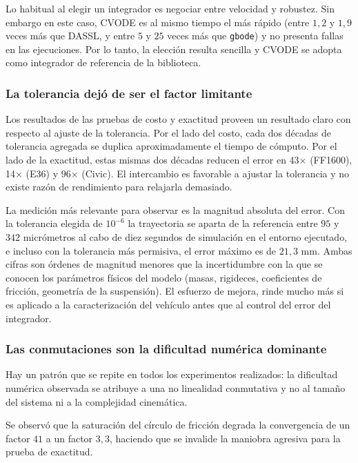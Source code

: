 Lo habitual al elegir un integrador es negociar entre velocidad y robustez. Sin embargo en este caso, CVODE es al mismo tiempo el más rápido (entre $1{,}2$ y $1{,}9$ veces más que DASSL, y entre $5$ y $25$ veces más que \verb|gbode|) y no presenta fallas en las ejecuciones. Por lo tanto, la elección resulta sencilla y CVODE se adopta como integrador de referencia de la biblioteca.

\subsubsection{La tolerancia dejó de ser el factor limitante}

Los resultados de las pruebas de costo y exactitud proveen un resultado claro con respecto al ajuste de la tolerancia. Por el lado del costo, cada dos décadas de tolerancia agregada se duplica aproximadamente el tiempo de cómputo. Por el lado de la exactitud, estas mismas dos décadas reducen el error en 43× (FF1600), 14× (E36) y 96× (Civic). El intercambio es favorable a ajustar la tolerancia y no existe razón de rendimiento para relajarla demasiado.
 
La medición más relevante para observar es la magnitud absoluta del error. Con la tolerancia elegida de $10^{-6}$ la trayectoria se aparta de la referencia entre $95$ y $342$ micrómetros al cabo de diez segundos de simulación en el entorno ejecutado, e incluso con la tolerancia más permisiva, el error máximo es de $21{,}3$ mm. Ambas cifras son órdenes de magnitud menores que la incertidumbre con la que se conocen los parámetros físicos del modelo (masas, rigideces, coeficientes de fricción, geometría de la suspensión). El esfuerzo de mejora, rinde mucho más si es aplicado a la caracterización del vehículo antes que al control del error del integrador.

\subsubsection{Las conmutaciones son la dificultad numérica dominante}

Hay un patrón que se repite en todos los experimentos realizados: la dificultad numérica observada se atribuye a una no linealidad conmutativa y no al tamaño del sistema ni a la complejidad cinemática.

Se observó que la saturación del círculo de fricción degrada la convergencia de un factor $41$ a un factor $3{,}3$, haciendo que se invalide la maniobra agresiva para la prueba de exactitud. \\


